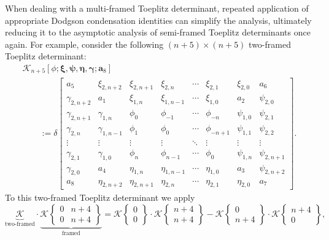 \documentclass[10pt,a4paper]{amsart}
\numberwithin{equation}{section}
\newcommand{\ga}{\gamma}
\newcommand{\de}{\delta}
\begin{document}
		When dealing with a multi-framed Toeplitz determinant, repeated application of appropriate Dodgson condensation identities can simplify the analysis, ultimately reducing it to the asymptotic analysis of semi-framed Toeplitz determinants once again. For example, consider the following $(n+5) \times (n+5)$ two-framed Toeplitz determinant:
		\begin{gather}
			\mathscr{K}_{n+5}[\phi; \boldsymbol{\xi}, \boldsymbol{\psi}, \boldsymbol{\eta}, \boldsymbol{\ga}; \boldsymbol{a}_8]\nonumber\\
\qquad := \de\begin{bmatrix}
				a_5 & \xi_{2,n+2} & \xi_{2,n+1} & \xi_{2,n} & \cdots & \xi_{2,1} & \xi_{2,0} & a_6 \\
				\ga_{2,n+2} &	a_1 & \xi_{1,n} & \xi_{1,n-1} & \cdots & \xi_{1,0} & a_2 & \psi_{2,0} \\
				\ga_{2,n+1} &	\ga_{1,n} &	\phi_0& \phi_{-1} & \cdots & \phi_{-n} & \psi_{1,0} & \psi_{2,1} \\
				\ga_{2,n} &	\ga_{1,n-1} &	\phi_{1}& \phi_0 & \cdots & \phi_{-n+1} & \psi_{1,1} & \psi_{2,2} \\
				\vdots &	\vdots & \vdots & \vdots & \ddots & \vdots & \vdots & \vdots \\
				\ga_{2,1} &	\ga_{1,0} &	\phi_{n} & \phi_{n-1} & \cdots & \phi_{0} & \psi_{1,n} & \psi_{2,n+1} \\
				\ga_{2,0} &	a_4 &	\eta_{1,n} & \eta_{1,n-1} & \cdots & \eta_{1,0} & a_3 & \psi_{2,n+2} \\
				a_8 &	\eta_{2,n+2} &	\eta_{2,n+1} & \eta_{2,n} & \cdots & \eta_{2,1} & \eta_{2,0} & a_7
			\end{bmatrix}.\label{two framed}
		\end{gather}
		To this two-framed Toeplitz determinant we apply
		\begin{equation}\label{DODGSON framed C} \underbrace{\mathscr{K}}_{\text{two-framed}}
			\cdot \underbrace{ \mathscr{K}\left\lbrace \begin{matrix} 0 & n+4 \\ 0 & n+4 \end{matrix} \right\rbrace }_{\text{framed}} = \mathscr{K}\left\lbrace \begin{matrix} 0 \\ 0 \end{matrix} \right\rbrace \cdot \mathscr{K}\left\lbrace \begin{matrix} n+4 \\ n+4 \end{matrix} \right\rbrace - \mathscr{K}\left\lbrace \begin{matrix} 0 \\ n+4 \end{matrix} \right\rbrace \cdot \mathscr{K}\left\lbrace \begin{matrix} n+4 \\ 0 \end{matrix} \right\rbrace,
		\end{equation}
\end{document}
